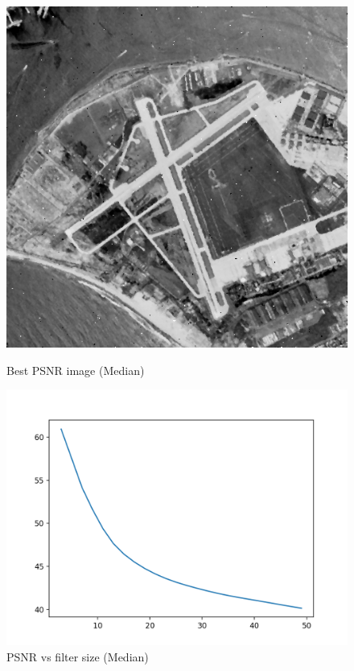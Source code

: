 \documentclass{article}
\begin{document}
    \begin{figure}[!htb]
      \includegraphics[scale=0.3]{./basic_denoising/sandiego/median_best_sp.png}
      \caption{Best PSNR image (Median)}
    \endminipage \hfill
      \includegraphics[scale=.45]{./basic_denoising/sandiego/median_psnr_sp.png}
      \caption{PSNR vs filter size (Median)}
    \endminipage
    \end{figure}
    \pagebreak
\end{document}
